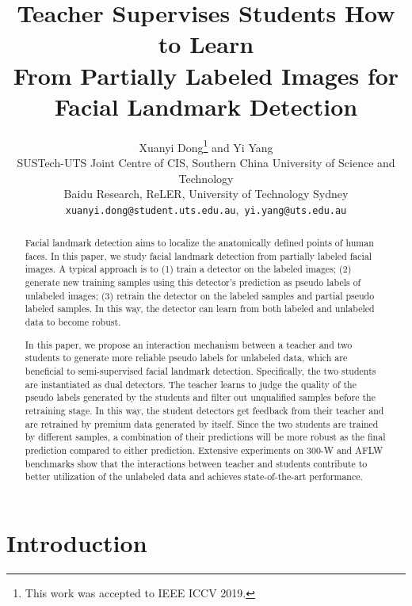 \documentclass[10pt,twocolumn,letterpaper]{article}
\begin{document}
\title{Teacher Supervises Students How to Learn\\From Partially Labeled Images for Facial Landmark Detection}

\author{Xuanyi Dong\thanks{This work was accepted to IEEE ICCV 2019.} and Yi Yang\\
SUSTech-UTS Joint Centre of CIS, Southern China University of Science and Technology\\ Baidu Research,  ReLER, University of Technology Sydney\\
{\tt\small xuanyi.dong@student.uts.edu.au},~{\tt\small yi.yang@uts.edu.au}
}

\maketitle


\begin{abstract}
Facial landmark detection aims to localize the anatomically defined points of human faces. In this paper, we study facial landmark detection from partially labeled facial images. A typical approach is to (1) train a detector on the labeled images; (2) generate new training samples using this detector's prediction as pseudo labels of unlabeled images; (3) retrain the detector on the labeled samples and partial pseudo labeled samples. In this way, the detector can learn from both labeled and unlabeled data to become robust.

In this paper, we propose an interaction mechanism between a teacher and two students to generate more reliable pseudo labels for unlabeled data, which are beneficial to semi-supervised facial landmark detection. Specifically, the two students are instantiated as dual detectors.
The teacher learns to judge the quality of the pseudo labels generated by the students and filter out unqualified samples before the retraining stage.
In this way, the student detectors get feedback from their teacher and are retrained by premium data generated by itself.
Since the two students are trained by different samples, a combination of their predictions will be more robust as the final prediction compared to either prediction.
Extensive experiments on 300-W and AFLW benchmarks show that the interactions between teacher and students contribute to better utilization of the unlabeled data and achieves state-of-the-art performance.
\end{abstract}

\section{Introduction}
\end{document}
